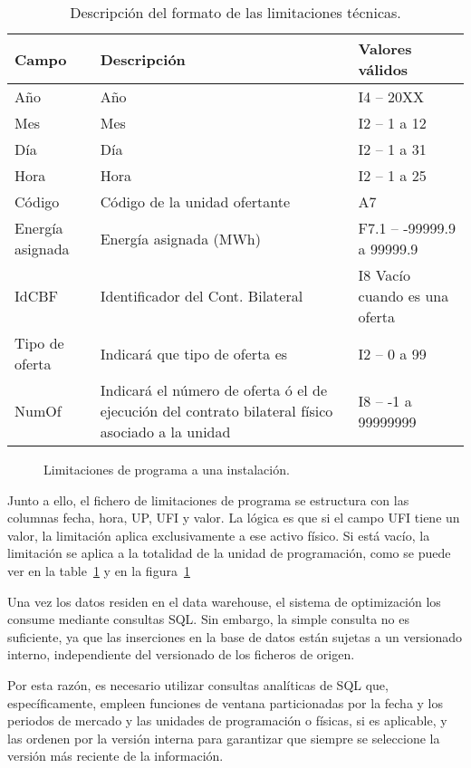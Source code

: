 \begin{table}[ht]
  \centering
  \begin{tabular}{|l|p{5cm}|l|}
    \hline
    Campo & Descripción & Valores válidos\\
    \hline
    Año & Año & I4 -- 20XX\\
    Mes & Mes & I2 -- 1 a 12\\
    Día & Día & I2 -- 1 a 31\\
    Hora & Hora & I2 -- 1 a 25\\
    Código & Código de la unidad ofertante & A7\\
    Energía asignada & Energía asignada (MWh) & F7.1 – -99999.9 a 99999.9\\
    IdCBF & Identificador del Cont. Bilateral & I8 Vacío cuando es una oferta\\
    Tipo de oferta & Indicará que tipo de oferta es & I2 – 0 a 99\\
    NumOf & Indicará el número de oferta ó el de ejecución del contrato bilateral físico asociado a la unidad & I8 – -1 a 99999999\\
    \hline
  \end{tabular}
  \caption{Descripción del formato de las limitaciones técnicas.}
  \label{tab:descripción-limitaciones}
\end{table}

\begin{figure}
  \centering
  \caption{Limitaciones de programa a una instalación.}
  \label{fig:contenido-limitaciones}
\end{figure}

Junto a ello, el fichero de limitaciones de programa se estructura con las columnas fecha, hora, UP, UFI y valor. La lógica es que si el campo UFI tiene un valor, la limitación aplica exclusivamente a ese activo físico. Si está vacío, la limitación se aplica a la totalidad de la unidad de programación, como se puede ver en la table~\ref{tab:descripción-limitaciones} y en la figura~\ref{fig:contenido-limitaciones}

Una vez los datos residen en el data warehouse, el sistema de optimización los consume mediante consultas SQL. Sin embargo, la simple consulta no es suficiente, ya que las inserciones en la base de datos están sujetas a un versionado interno, independiente del versionado de los ficheros de origen.

Por esta razón, es necesario utilizar consultas analíticas de SQL que, específicamente, empleen funciones de ventana particionadas por la fecha y los periodos de mercado y las unidades de programación o físicas, si es aplicable, y las ordenen por la versión interna para garantizar que siempre se seleccione la versión más reciente de la información.

